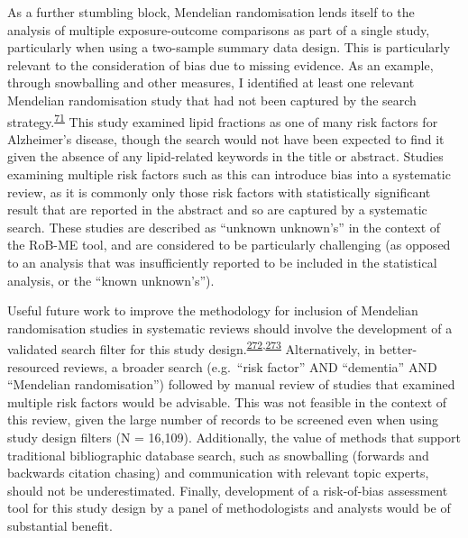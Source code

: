 \documentclass[a4paper, twoside]{templates/ociamthesis}
\begin{document}
As a further stumbling block, Mendelian randomisation lends itself to the analysis of multiple exposure-outcome comparisons as part of a single study, particularly when using a two-sample summary data design. This is particularly relevant to the consideration of bias due to missing evidence. As an example, through snowballing and other measures, I identified at least one relevant Mendelian randomisation study that had not been captured by the search strategy.\textsuperscript{\protect\hyperlink{ref-larsson2017}{71}} This study examined lipid fractions as one of many risk factors for Alzheimer's disease, though the search would not have been expected to find it given the absence of any lipid-related keywords in the title or abstract. Studies examining multiple risk factors such as this can introduce bias into a systematic review, as it is commonly only those risk factors with statistically significant result that are reported in the abstract and so are captured by a systematic search. These studies are described as ``unknown unknown's'' in the context of the RoB-ME tool, and are considered to be particularly challenging (as opposed to an analysis that was insufficiently reported to be included in the statistical analysis, or the ``known unknown's'').

Useful future work to improve the methodology for inclusion of Mendelian randomisation studies in systematic reviews should involve the development of a validated search filter for this study design.\textsuperscript{\protect\hyperlink{ref-waffenschmidt2020}{272},\protect\hyperlink{ref-wagner2020}{273}} Alternatively, in better-resourced reviews, a broader search (e.g.~``risk factor'' AND ``dementia'' AND ``Mendelian randomisation'') followed by manual review of studies that examined multiple risk factors would be advisable. This was not feasible in the context of this review, given the large number of records to be screened even when using study design filters (N = 16,109). Additionally, the value of methods that support traditional bibliographic database search, such as snowballing (forwards and backwards citation chasing) and communication with relevant topic experts, should not be underestimated. Finally, development of a risk-of-bias assessment tool for this study design by a panel of methodologists and analysts would be of substantial benefit.
\end{document}
